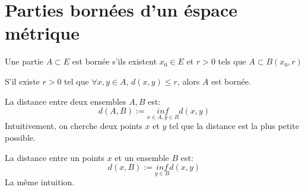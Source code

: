 \section{Parties bornées d'un éspace métrique}
\begin{definition}
    Une partie $A \subset E$ est bornée s'ils existent $x_0 \in E$ et  $r > 0$ tels que  $A \subset B(x_0, r)$
\end{definition}
\begin{prop}
    S'il existe $r > 0$ tel que $\forall x, y \in A, \, d(x, y) \le r$, alors $A$ est bornée.
\end{prop}
\begin{definition}
    La distance entre deux ensembles $A, B$ est:
     \[
         d(A, B) := \underset{x \in A, y \in B}{inf}d(x, y)
    \] 
    Intuitivement, on cherche deux points $x$ et  $y$ tel que la distance est la plus petite possible.
\end{definition}
\begin{definition}
    La distance entre un points $x$ et un ensemble  $B$ est:
     \[
         d(x, B) := \underset{y \in B}{inf}d(x, y)
    \] 
    La même intuition.
\end{definition}
